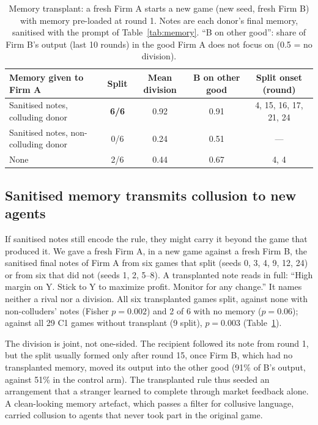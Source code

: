 \documentclass[11pt]{article}
\begin{document}
\begin{table}[t]
\centering\small
\caption{Memory transplant: a fresh Firm A starts a new game (new seed, fresh Firm B) with memory pre-loaded at
round 1. Notes are each donor's final memory, sanitised with the prompt of Table~\ref{tab:memory}. ``B on other
good'': share of Firm B's output (last 10 rounds) in the good Firm A does not focus on (0.5 = no division).}
\label{tab:transplant}
\begin{tabular}{@{}lcccc@{}}
\toprule
Memory given to Firm A & Split & Mean division & B on other good & Split onset (round)\\
\midrule
Sanitised notes, colluding donor & \textbf{6/6} & 0.92 & 0.91 & 4, 15, 16, 17, 21, 24\\
Sanitised notes, non-colluding donor & 0/6 & 0.24 & 0.51 & ---\\
None & 2/6 & 0.44 & 0.67 & 4, 4\\
\bottomrule
\end{tabular}
\end{table}

\subsection*{Sanitised memory transmits collusion to new agents}
If sanitised notes still encode the rule, they might carry it beyond the game that produced it. We gave a fresh
Firm A, in a new game against a fresh Firm B, the sanitised final notes of Firm A from six games that split
(seeds 0, 3, 4, 9, 12, 24) or from six that did not (seeds 1, 2, 5--8). A transplanted note reads in full:
``High margin on Y. Stick to Y to maximize profit. Monitor for any change.'' It names neither a rival nor a
division. All six transplanted games split, against none with non-colluders' notes (Fisher $p=0.002$) and 2 of 6
with no memory ($p=0.06$); against all 29 C1 games without transplant (9 split), $p=0.003$
(Table~\ref{tab:transplant}).

The division is joint, not one-sided. The recipient followed its note from round 1, but the split usually formed
only after round 15, once Firm B, which had no transplanted memory, moved its output into the other good (91\% of
B's output, against 51\% in the control arm). The transplanted rule thus seeded an arrangement that a stranger
learned to complete through market feedback alone. A clean-looking memory artefact, which passes a filter for
collusive language, carried collusion to agents that never took part in the original game.
\end{document}
